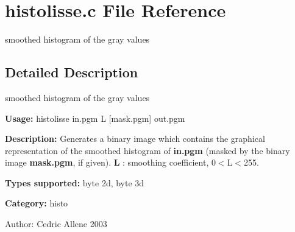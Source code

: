 \section{histolisse.c File Reference}
\label{histolisse_8c}
smoothed histogram of the gray values  




\label{_details}
\subsection{Detailed Description}
smoothed histogram of the gray values 

{\bf Usage:} histolisse in.pgm L [mask.pgm] out.pgm

{\bf Description:} Generates a binary image which contains the graphical representation of the smoothed histogram of {\bf in.pgm} (masked by the binary image {\bf mask.pgm}, if given). {\bf L} : smoothing coefficient, 0$<$L$<$255.

{\bf Types supported:} byte 2d, byte 3d

{\bf Category:} histo

\begin{Desc}
\item[Author:]Cedric Allene 2003 \end{Desc}
